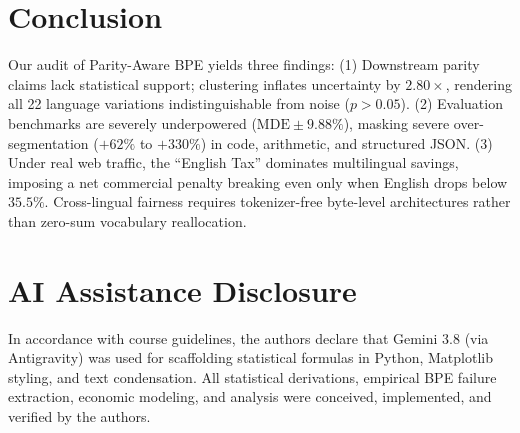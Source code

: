 
\section{Conclusion}
\label{sec:conclusion}

Our audit of Parity-Aware BPE yields three findings:
(1) Downstream parity claims lack statistical support; clustering inflates uncertainty by $2.80\times$, rendering all 22 language variations indistinguishable from noise ($p > 0.05$).
(2) Evaluation benchmarks are severely underpowered ($\mathrm{MDE} \pm 9.88\%$), masking severe over-segmentation ($+62\%$ to $+330\%$) in code, arithmetic, and structured JSON.
(3) Under real web traffic, the ``English Tax'' dominates multilingual savings, imposing a net commercial penalty breaking even only when English drops below $35.5\%$.
Cross-lingual fairness requires tokenizer-free byte-level architectures rather than zero-sum vocabulary reallocation.

\clearpage

\section*{AI Assistance Disclosure}
In accordance with course guidelines, the authors declare that Gemini 3.8 (via Antigravity) was used for scaffolding statistical formulas in Python, Matplotlib styling, and text condensation. All statistical derivations, empirical BPE failure extraction, economic modeling, and analysis were conceived, implemented, and verified by the authors.

